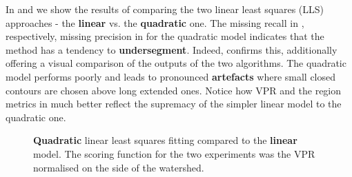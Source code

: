 In  and  we show the results of comparing the two linear least squares (LLS) approaches - the {\bf linear} vs. the {\bf quadratic} one. The missing recall in , respectively, missing precision in  for the quadratic model indicates that the method has a tendency to {\bf undersegment}. 
Indeed,  confirms this, additionally offering a visual comparison of the outputs of the two algorithms. The quadratic model performs poorly and leads to pronounced {\bf artefacts} where small closed contours are chosen above long extended ones. Notice how VPR  and the region metrics in  much better reflect the supremacy of the simpler linear model to the quadratic one. %

\begin{figure}[ht!]
\centering
\caption[{\bf Quadratic} linear least squares fitting compared to the {\bf linear} model - plots]{{\bf Quadratic} linear least squares fitting compared to the {\bf linear} model. The scoring function for the two experiments was the VPR normalised on the side of the watershed.}
\label{fig:quadratic-lls-fitting}
\end{figure}

